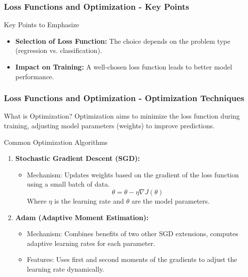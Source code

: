 \documentclass[aspectratio=169]{beamer}
\begin{document}
\begin{frame}[fragile]
    \frametitle{Loss Functions and Optimization - Key Points}
    \begin{block}{Key Points to Emphasize}
        \begin{itemize}
            \item \textbf{Selection of Loss Function:} The choice depends on the problem type (regression vs. classification).
            \item \textbf{Impact on Training:} A well-chosen loss function leads to better model performance.
        \end{itemize}
    \end{block}
\end{frame}

\begin{frame}[fragile]
    \frametitle{Loss Functions and Optimization - Optimization Techniques}
    \begin{block}{What is Optimization?}
        Optimization aims to minimize the loss function during training, adjusting model parameters (weights) to improve predictions.
    \end{block}
    
    \begin{block}{Common Optimization Algorithms}
        \begin{enumerate}
            \item \textbf{Stochastic Gradient Descent (SGD):}
            \begin{itemize}
                \item Mechanism: Updates weights based on the gradient of the loss function using a small batch of data.
                \begin{equation}
                    \theta = \theta - \eta \nabla J(\theta)
                \end{equation}
                Where \( \eta \) is the learning rate and \( \theta \) are the model parameters.
            \end{itemize}
            
            \item \textbf{Adam (Adaptive Moment Estimation):}
            \begin{itemize}
                \item Mechanism: Combines benefits of two other SGD extensions, computes adaptive learning rates for each parameter.
                \item Features: Uses first and second moments of the gradients to adjust the learning rate dynamically.
            \end{itemize}
        \end{enumerate}
    \end{block}
\end{frame}
\end{document}
